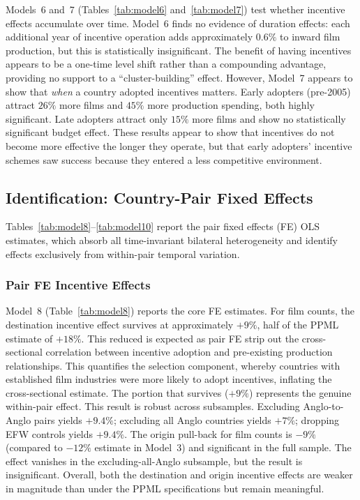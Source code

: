 Models~6 and~7 (Tables~\ref{tab:model6} and~\ref{tab:model7}) test whether incentive effects accumulate over time. Model~6 finds no evidence of duration effects: each additional year of incentive operation adds approximately $0.6\%$ to inward film production, but this is statistically insignificant. The benefit of having incentives appears to be a one-time level shift rather than a compounding advantage, providing no support to a ``cluster-building'' effect. However, Model~7 appears to show that \textit{when} a country adopted incentives matters. Early adopters (pre-2005) attract $26\%$ more films and $45\%$ more production spending, both highly significant. Late adopters attract only $15\%$ more films and show no statistically significant budget effect.  These results appear to show that incentives do not become more effective the longer they operate, but that early adopters' incentive schemes saw success because they entered a less competitive environment.

\subsection{Identification: Country-Pair Fixed Effects}
\label{sec:pair_fe_results}

Tables~\ref{tab:model8}--\ref{tab:model10} report the pair fixed effects (FE) OLS estimates, which absorb all time-invariant bilateral heterogeneity and identify effects exclusively from within-pair temporal variation.

\subsubsection{Pair FE Incentive Effects}

Model~8 (Table~\ref{tab:model8}) reports the core FE estimates. For film counts, the destination incentive effect survives at approximately $+9\%$, half of the PPML estimate of $+18\%$. This reduced is expected as pair FE strip out the cross-sectional correlation between incentive adoption and pre-existing production relationships. This quantifies the selection component, whereby countries with established film industries were more likely to adopt incentives, inflating the cross-sectional estimate. The portion that survives ($+9\%$) represents the genuine within-pair effect. This result is robust across subsamples. Excluding Anglo-to-Anglo pairs yields $+9.4\%$; excluding all Anglo countries yields $+7\%$; dropping EFW controls yields $+9.4\%$. The origin pull-back for film counts is $-9\%$ (compared to $-12\%$ estimate in Model~3) and significant in the full sample. The effect vanishes in the excluding-all-Anglo subsample, but the result is insignificant. Overall, both the destination and origin incentive effects are weaker in magnitude than under the PPML specifications but remain meaningful.

